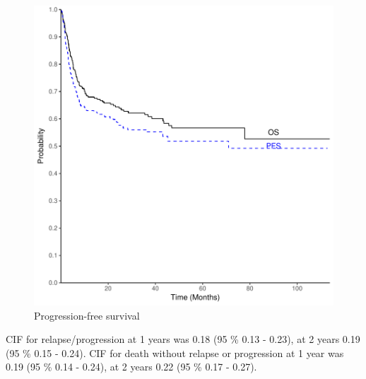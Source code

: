 \documentclass[a4paper,11pt] {article}
\begin{document}
\begin{figure}[h]
\begin{center}
\includegraphics{Rapport-fig3}
\end{center}
\caption{Progression-free survival}
\label{fig3}
\end{figure}



\pagebreak
CIF for relapse/progression at 1 years was 0.18 (95 \% 0.13 - 0.23), at 2 years  0.19 (95 \% 0.15 - 0.24).
CIF for death without relapse or progression at 1 year was 0.19 (95 \% 0.14 - 0.24), at 2 years  0.22 (95 \% 0.17 - 0.27). 
\end{document}
